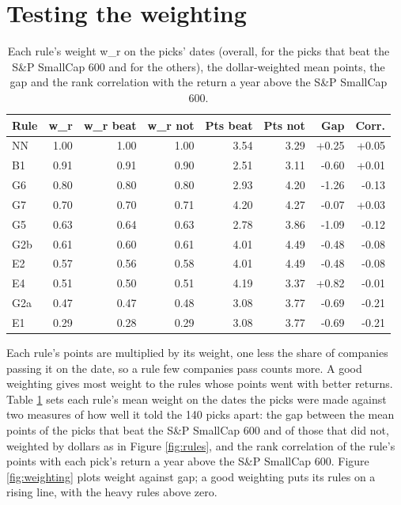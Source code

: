 \documentclass[11pt,a4paper]{article}
\begin{document}
\section{Testing the weighting}
\label{app:weighting}
\begin{table}[H]
\centering
\small
\caption{Each rule's weight w\_r on the picks' dates (overall, for the picks that beat the S\&P SmallCap 600 and for the others), the dollar-weighted mean points, the gap and the rank correlation with the return a year above the S\&P SmallCap 600.}\label{tab:weighting}
\begin{tabular}{l r r r r r r r}
\hline
Rule & w\_r & w\_r beat & w\_r not & Pts beat & Pts not & Gap & Corr. \\
\hline
NN & 1.00 & 1.00 & 1.00 & 3.54 & 3.29 & +0.25 & +0.05 \\
B1 & 0.91 & 0.91 & 0.90 & 2.51 & 3.11 & -0.60 & +0.01 \\
G6 & 0.80 & 0.80 & 0.80 & 2.93 & 4.20 & -1.26 & -0.13 \\
G7 & 0.70 & 0.70 & 0.71 & 4.20 & 4.27 & -0.07 & +0.03 \\
G5 & 0.63 & 0.64 & 0.63 & 2.78 & 3.86 & -1.09 & -0.12 \\
G2b & 0.61 & 0.60 & 0.61 & 4.01 & 4.49 & -0.48 & -0.08 \\
E2 & 0.57 & 0.56 & 0.58 & 4.01 & 4.49 & -0.48 & -0.08 \\
E4 & 0.51 & 0.50 & 0.51 & 4.19 & 3.37 & +0.82 & -0.01 \\
G2a & 0.47 & 0.47 & 0.48 & 3.08 & 3.77 & -0.69 & -0.21 \\
E1 & 0.29 & 0.28 & 0.29 & 3.08 & 3.77 & -0.69 & -0.21 \\
\hline
\end{tabular}
\end{table}
Each rule's points are multiplied by its weight, one less the share of companies passing it on the date, so a rule few companies pass counts more. A good weighting gives most weight to the rules whose points went with better returns. Table \ref{tab:weighting} sets each rule's mean weight on the dates the picks were made against two measures of how well it told the 140 picks apart: the gap between the mean points of the picks that beat the S\&P SmallCap 600 and of those that did not, weighted by dollars as in Figure \ref{fig:rules}, and the rank correlation of the rule's points with each pick's return a year above the S\&P SmallCap 600. Figure \ref{fig:weighting} plots weight against gap; a good weighting puts its rules on a rising line, with the heavy rules above zero.
\end{document}
